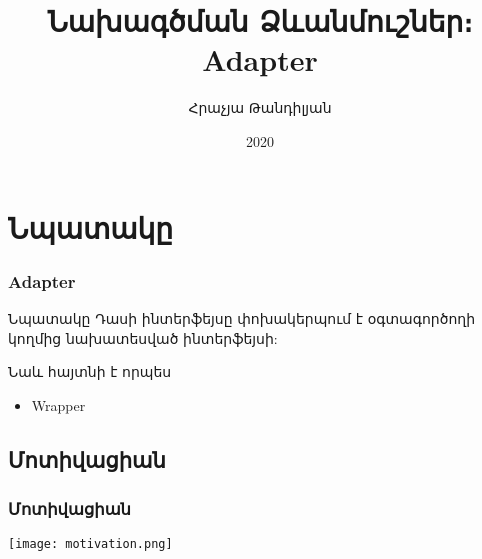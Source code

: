 \documentclass{beamer}
\begin{document}
\title[Adapter]{Նախագծման Ձևանմուշներ։ Adapter}
\author[Հրաչյա Թանդիլյան\copyright]{Հրաչյա Թանդիլյան}
\date{2020}

\begin{frame}
\titlepage
\end{frame}

\section{Նպատակը}
\begin{frame}\frametitle{Adapter}
\begin{block}{Նպատակը}
    Դասի ինտերֆեյսը փոխակերպում է օգտագործողի կողմից նախատեսված ինտերֆեյսի:
\end{block}
\vfill
Նաև հայտնի է որպես
\begin{itemize}
    \item Wrapper
\end{itemize}
\end{frame}

\subsection{Մոտիվացիան}
\begin{frame}\frametitle{Մոտիվացիան}
\begin{center}
    \texttt{[image: motivation.png]}
\end{center}
\end{frame}
\end{document}
